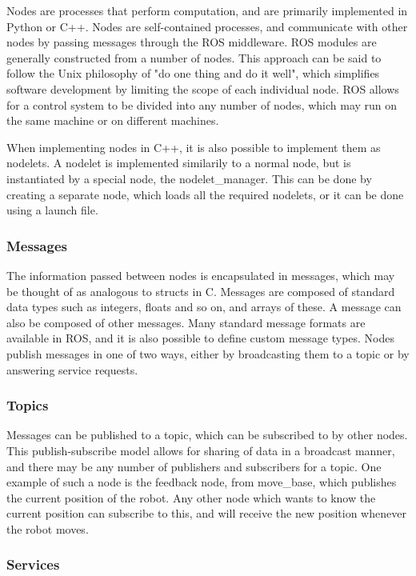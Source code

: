 \documentclass[\rootfolder/main.tex]{subfiles}
\begin{document}
Nodes are processes that perform computation, and are primarily implemented in Python or C++.
Nodes are self-contained processes, and communicate with other nodes by passing messages through the ROS middleware.
ROS modules are generally constructed from a number of nodes.
This approach can be said to follow the Unix philosophy of "do one thing and do it well", which simplifies software development by limiting the scope of each individual node.
ROS allows for a control system to be divided into any number of nodes, which may run on the same machine or on different machines.

When implementing nodes in C++, it is also possible to implement them as nodelets.
A nodelet is implemented similarily to a normal node, but is instantiated by a special node, the nodelet\_manager.
This can be done by creating a separate node, which loads all the required nodelets, or it can be done using a launch file.

\subsubsection{Messages}

The information passed between nodes is encapsulated in messages, which may be thought of as analogous to structs in C.
Messages are composed of standard data types such as integers, floats and so on, and arrays of these.
A message can also be composed of other messages.
Many standard message formats are available in ROS, and it is also possible to define custom message types.
Nodes publish messages in one of two ways, either by broadcasting them to a topic or by answering service requests.

\subsubsection{Topics}

Messages can be published to a topic, which can be subscribed to by other nodes.
This publish-subscribe model allows for sharing of data in a broadcast manner, and there may be any number of publishers and subscribers for a topic.
One example of such a node is the feedback node, from move\_base, which publishes the current position of the robot.
Any other node which wants to know the current position can subscribe to this, and will receive the new position whenever the robot moves.

\subsubsection{Services}
\end{document}
